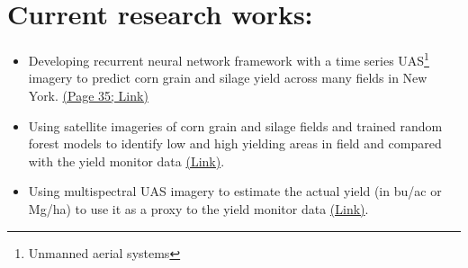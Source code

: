 \documentclass[11pt]{article}
\begin{document}
\vspace{-1em}
\section{Current research works:}\vspace{-0.3em}
\begin{itemize}[leftmargin=0.4cm, itemsep = -0.7em]
\item Developing recurrent neural network framework with a time series UAS\footnote{Unmanned aerial systems} imagery to predict corn grain and silage yield across many fields in New York. \href{https://www.esf.edu/stratus/stratus-2022-5-23.pdf}{(Page 35; Link)}
\item Using satellite imageries of corn grain and silage fields and trained random forest models to identify low and high yielding areas in field and compared with the yield monitor data \href{https://nnyagdev.org/wp-content/uploads/2021/02/NNYADPSatelliteDroneReportFINAL.pdf}{(Link)}.
\item Using multispectral UAS imagery to estimate the actual yield (in bu/ac or Mg/ha) to use it as a proxy to the yield monitor data \href{https://www.mdpi.com/2072-4292/13/19/3948}{(Link)}.
\end{itemize}
\end{document}
